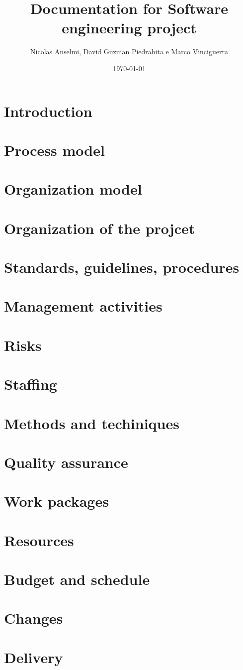 \documentclass{article}
\title{Documentation for Software engineering project}
\author{Nicolas Anselmi, David Guzman Piedrahita e Marco Vinciguerra}
\date{\today}
\begin{document}
\maketitle

\section{Introduction}

\section{Process model}

\section{Organization model}

\section{Organization of the projcet}

\section{Standards, guidelines, procedures}

\section{Management activities}

\section{Risks}

\section{Staffing}

\section{Methods and techiniques}

\section{Quality assurance}

\section{Work packages}


\section{Resources}

\section{Budget and schedule}

\section{Changes}

\section{Delivery}
\end{document}
